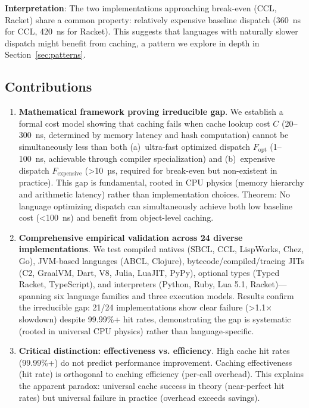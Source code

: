 \documentclass[sigplan,final,acmsmall,review,screen]{acmart}
\begin{document}
\textbf{Interpretation}: The two implementations approaching break-even (CCL, Racket) share a common property: relatively expensive
baseline dispatch (360~ns for CCL, 420~ns for Racket). This suggests that languages with naturally slower dispatch might benefit from caching,
a pattern we explore in depth in Section~\ref{sec:patterns}.

\subsection{Contributions}

\begin{enumerate}
  \item \textbf{Mathematical framework proving irreducible gap}. We establish a formal cost model showing that caching fails when
    cache lookup cost $C$ (20--300~ns, determined by memory latency and hash computation) cannot be simultaneously less than both
    (a)~ultra-fast optimized dispatch $F_{\text{opt}}$ (1--100~ns, achievable through compiler specialization) and (b)~expensive dispatch
    $F_{\text{expensive}}$ (>10~µs, required for break-even but non-existent in practice). This gap is fundamental, rooted in CPU physics
    (memory hierarchy and arithmetic latency) rather than implementation choices. Theorem: No language optimizing dispatch can simultaneously
    achieve both low baseline cost (<100~ns) and benefit from object-level caching.

  \item \textbf{Comprehensive empirical validation across 24 diverse implementations}. We test compiled natives (SBCL, CCL, LispWorks, Chez, Go),
    JVM-based languages (ABCL, Clojure), bytecode/compiled/tracing JITs (C2, GraalVM, Dart, V8, Julia, LuaJIT, PyPy), optional types (Typed Racket, TypeScript), and interpreters
    (Python, Ruby, Lua 5.1, Racket)—spanning six language families and three execution models. Results confirm the irreducible gap: 21/24 implementations show clear failure
    (>1.1× slowdown) despite 99.99\%+ hit rates, demonstrating the gap is systematic (rooted in universal CPU physics) rather than language-specific.

  \item \textbf{Critical distinction: effectiveness vs. efficiency}. High cache hit rates (99.99\%+) do not predict performance improvement.
    Caching effectiveness (hit rate) is orthogonal to caching efficiency (per-call overhead). This explains the apparent paradox: universal cache success
    in theory (near-perfect hit rates) but universal failure in practice (overhead exceeds savings).


\end{enumerate}
\end{document}
